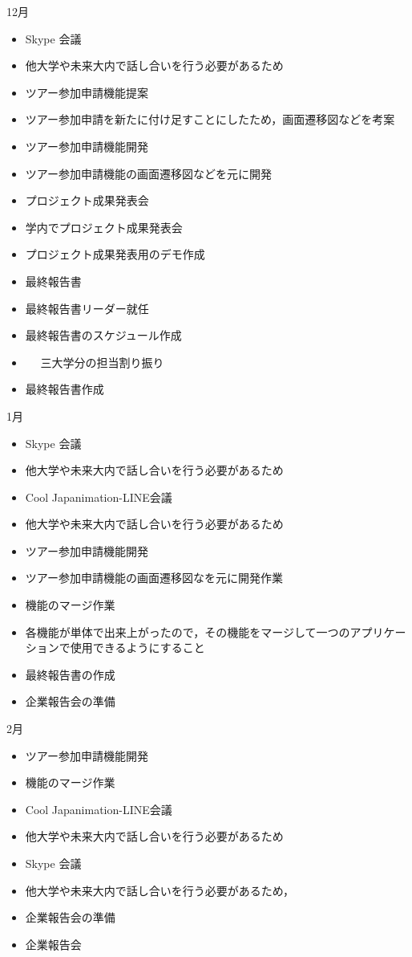 12月
\begin{itemize}
\item Skype 会議
\item   他大学や未来大内で話し合いを行う必要があるため
\item ツアー参加申請機能提案
\item    ツアー参加申請を新たに付け足すことにしたため，画面遷移図などを考案
\item ツアー参加申請機能開発
\item    ツアー参加申請機能の画面遷移図などを元に開発
\item プロジェクト成果発表会
\item    学内でプロジェクト成果発表会
\item    プロジェクト成果発表用のデモ作成
\item 最終報告書
\item   最終報告書リーダー就任
\item   最終報告書のスケジュール作成
\item　 三大学分の担当割り振り
\item   最終報告書作成
\end{itemize}

1月
\begin{itemize}
\item Skype 会議
\item   他大学や未来大内で話し合いを行う必要があるため
\item Cool Japanimation-LINE会議
\item   他大学や未来大内で話し合いを行う必要があるため
\item ツアー参加申請機能開発
\item   ツアー参加申請機能の画面遷移図なを元に開発作業
\item 機能のマージ作業
\item   各機能が単体で出来上がったので，その機能をマージして一つのアプリケーションで使用できるようにすること
\item 最終報告書の作成
\item 企業報告会の準備
\end{itemize}

2月
\begin{itemize}
\item ツアー参加申請機能開発
\item 機能のマージ作業
\item Cool Japanimation-LINE会議
\item   他大学や未来大内で話し合いを行う必要があるため
\item Skype 会議
\item   他大学や未来大内で話し合いを行う必要があるため，
\item 企業報告会の準備
\item 企業報告会
\end{itemize}

